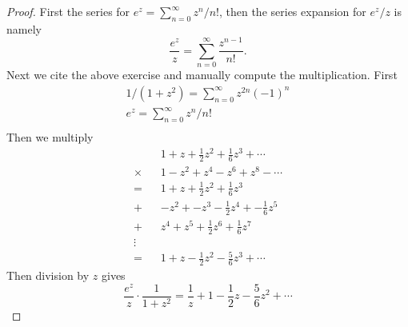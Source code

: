 \documentclass[11pt]{amsart}
\theoremstyle{definition}
\numberwithin{theorem}{section}
\numberwithin{definition}{section}
\numberwithin{equation}{section}
\begin{document}
\begin{proof} 
First the series for $e^z = \sum_{n=0}^\infty z^n/n!$, then the series expansion for $e^z/z$ is namely
\begin{equation*}
	\frac{e^z}{z} = \sum_{n=0}^\infty \frac{z^{n-1}}{n!}.
\end{equation*}
Next we cite the above exercise and manually compute 
the multiplication. First
\begin{equation*}
	\begin{aligned}
		1/(1+z^2) = \sum_{n=0}^\infty z^{2n}(-1)^n \\
		e^z = \sum_{n=0}^\infty z^n/n! \\
	\end{aligned}
\end{equation*}
Then we multiply
\begin{equation*}
	\begin{aligned}
		&1 + z + \frac{1}{2}z^2 + \frac{1}{6}z^3 + \cdots\\
		\times\;\;\; &1 -z^2 + z^4 - z^6 + z^8 -\cdots \\
		=\;\;\;& 1 + z + \frac{1}{2}z^2 + \frac{1}{6}z^3 \\
		+\;\;\;& -z^2 + -z^3 - \frac{1}{2}z^4 + -\frac{1}{6}z^5 \\
		+\;\;\;&z^4 + z^5 + \frac{1}{2}z^6 + \frac{1}{6}z^7 \\
		\vdots\;\;\;\; \\
		=\;\;\;&1 + z - \frac{1}{2}z^2 - \frac{5}{6}z^3 + \cdots
	\end{aligned}
\end{equation*}
Then division by $z$ gives
\begin{equation*}
	\frac{e^z}{z}\cdot  \frac{1}{1+z^2} = \frac{1}{z} + 1 - \frac{1}{2}z - \frac{5}{6}z^2 + \cdots
\end{equation*}

\end{proof}
\end{document}
